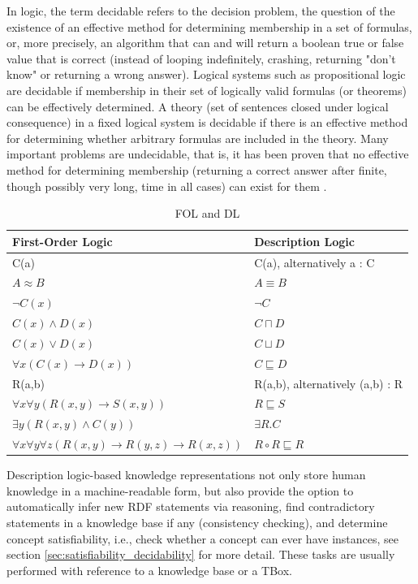 In logic, the term decidable refers to the decision problem, the question of the existence of an effective method for determining membership in a set of formulas, or, more precisely, an algorithm that can and will return a boolean true or false value that is correct (instead of looping indefinitely, crashing, returning "don't know" or returning a wrong answer). Logical systems such as propositional logic are decidable if membership in their set of logically valid formulas (or theorems) can be effectively determined. A theory (set of sentences closed under logical consequence) in a fixed logical system is decidable if there is an effective method for determining whether arbitrary formulas are included in the theory. Many important problems are undecidable, that is, it has been proven that no effective method for determining membership (returning a correct answer after finite, though possibly very long, time in all cases) can exist for them \cite{Decidability}.

\begin{longtable}[h]{ p{65mm} p{65mm} }
\caption{FOL and DL}
\label{table:FOL_DL}\\
\hline
First-Order Logic & Description Logic\\
\hline
C(a) & C(a), alternatively a : C\\
$A \approx B$ & $A \equiv B$\\
$\neg C(x)$ & $\neg C$\\
$C(x) \land D(x)$ &	$C \sqcap D$\\
$C(x) \lor D(x)$ & $C \sqcup D$\\
$\forall x(C(x) \rightarrow D(x))$ & $C \sqsubseteq D$\\
R(a,b) & R(a,b), alternatively (a,b) : R\\
$\forall x \forall y(R(x,y) \rightarrow S(x,y))$ & $R \sqsubseteq S$\\
$\exists y(R(x,y) \land C(y))$ & $\exists R.C$\\
$\forall x \forall y \forall z(R(x,y) \rightarrow R(y,z) \rightarrow R(x,z))$ & $R \circ R \sqsubseteq R$\\
\hline
\end{longtable}

Description logic-based knowledge representations not only store human knowledge in a machine-readable form, but also provide the option to automatically infer new RDF statements via reasoning, find contradictory statements in a knowledge base if any (consistency checking), and determine concept satisfiability, i.e., check whether a concept can ever have instances, see section \ref{sec:satisfiability_decidability} for more detail. These tasks are usually performed with reference to a knowledge base or a TBox.

